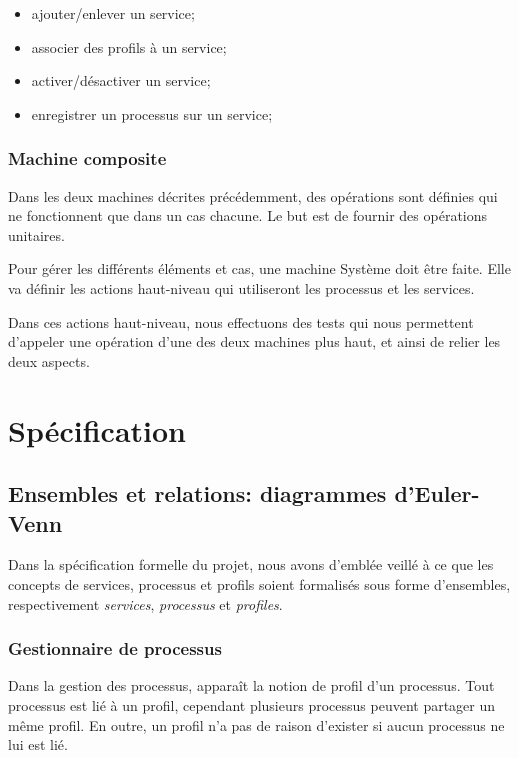 \documentclass[french, titlepage, 10pt, a4paper]{article}
\begin{document}
            \begin{itemize}
                \item ajouter/enlever un service;
                \item associer des profils à un service;
                \item activer/désactiver un service;
                \item enregistrer un processus sur un service;
            \end{itemize}


        \subsubsection{Machine composite}


            Dans les deux machines décrites précédemment, des opérations sont
            définies qui ne fonctionnent que dans un cas chacune. Le but est de
            fournir des opérations unitaires.

            Pour gérer les différents éléments et cas, une machine Système doit être faite.
            Elle va définir les actions haut-niveau qui utiliseront les processus et les
            services.

            Dans ces actions haut-niveau, nous effectuons des tests qui nous
            permettent d'appeler une opération d'une des deux machines plus
            haut, et ainsi de relier les deux aspects.



\section{Spécification}

\subsection{Ensembles et relations: diagrammes d'Euler-Venn}

Dans la spécification formelle du projet, nous avons d'emblée veillé à ce que
les concepts de services, processus et profils soient formalisés sous forme
d'ensembles, respectivement \emph{services}, \emph{processus} et
\emph{profiles}.

\subsubsection{Gestionnaire de processus}

Dans la gestion des processus, apparaît la notion de profil d'un processus.
Tout processus est lié à un profil, cependant plusieurs processus peuvent
partager un même profil.
En outre, un profil n'a pas de raison d'exister si aucun processus ne lui est
lié.
\end{document}
